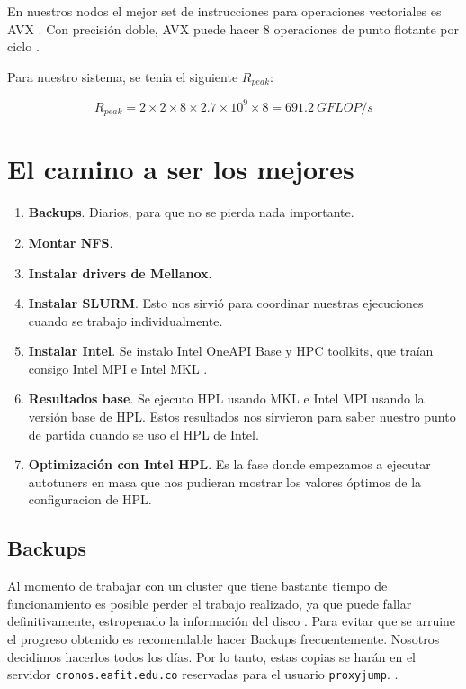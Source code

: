\documentclass[conference,compsoc]{IEEEtran}
\begin{document}
En nuestros nodos el mejor set de instrucciones para operaciones vectoriales es AVX \cite{intel-avx}. Con precisión doble, AVX puede hacer 8 operaciones de punto flotante por ciclo \cite{wikichip-flops}.

Para nuestro sistema, se tenia el siguiente $R_{peak}$:

\begin{equation} \label{rpeak_two_node}
	R_{peak} = 2 \times 2 \times 8 \times 2.7 \times 10^{9} \times 8 = 691.2\ {GFLOP}/s
\end{equation}

\section{El camino a ser los mejores}

\begin{enumerate}
	\item \textbf{Backups}. Diarios, para que no se pierda nada importante.
	\item \textbf{Montar NFS}.
	\item \textbf{Instalar drivers de Mellanox}.
	\item \textbf{Instalar SLURM}. Esto nos sirvió para coordinar nuestras ejecuciones cuando se trabajo individualmente.
	\item \textbf{Instalar Intel}. Se instalo Intel OneAPI \cite{intel-oneapi} Base y HPC toolkits, que traían consigo Intel MPI \cite{intel-mpi} e Intel MKL \cite{intel-mkl-blas}. 
	\item \textbf{Resultados base}. Se ejecuto HPL usando MKL e Intel MPI usando la versión base de HPL. Estos resultados nos sirvieron para saber nuestro punto de partida cuando se uso el HPL de Intel.
	\item \textbf{Optimización con Intel HPL}. Es la fase donde empezamos a ejecutar  autotuners en masa que nos pudieran mostrar los valores óptimos de la configuracion de HPL.
\end{enumerate}

\subsection{Backups}
Al momento de trabajar con un cluster que tiene bastante tiempo de funcionamiento es posible perder el trabajo realizado, ya que puede fallar definitivamente, estropenado la información del disco \cite{Meta-Volante-0}. Para evitar que se arruine el progreso obtenido es recomendable hacer Backups frecuentemente. Nosotros decidimos hacerlos todos los días. Por lo tanto, estas copias se harán en el servidor \verb|cronos.eafit.edu.co| reservadas para el usuario \verb|proxyjump|. \cite{Meta-Volante-0}.
\end{document}
